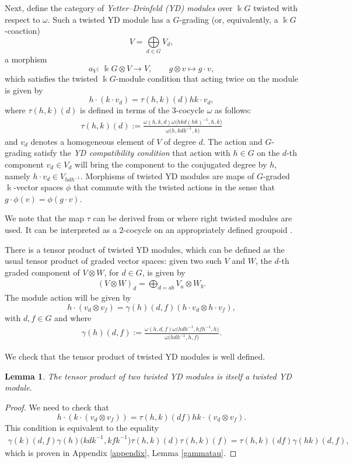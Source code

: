 \documentclass[pdftex]{sigma}
\numberwithin{equation}{section}
\newtheorem{Lemma}[Theorem]{Lemma}
\begin{document}
Next, define the category of \emph{Yetter--Drinfeld (YD) modules} over $\Bbbk G$ twisted with respect to $\omega$. Such a twisted YD module has a $G$-grading (or, equivalently, a $\Bbbk G$-coaction)
\[V=\bigoplus\limits_{d \in G} V_d,\]
 a morphism
 \[a_V\colon\ \Bbbk G\otimes V\to V, \qquad g\otimes v\mapsto g\cdot v,\]
 which satisfies the twisted $\Bbbk G$-module condition that acting twice on the module is given by
\[
 h \cdot ( k \cdot v_d )=\tau (h,k)(d) hk \cdot v_d,
\]
where $\tau (h,k)(d)$ is defined in terms of the $3$-cocycle $\omega$ as follows:
\begin{align}\label{eq-taudef}
 \tau (h,k)(d):=\frac{\omega(h,k,d) \omega \big(hkd(hk)^{-1},h,k\big)}{\omega\big(h,kdk^{-1},k\big)}
\end{align}
and $v_d$ denotes a homogeneous element of $V$ of degree $d$.
The action and $G$-grading satisfy the \emph{YD compatibility condition} that action with $h \in G$ on the $d$-th component $v_d \in V_d$ will bring the component to the conjugated degree by $h$, namely $h \cdot v_d \in V_{h d h^{-1}}$. Morphisms of twisted YD modules are maps of $G$-graded $\Bbbk$-vector spaces $\phi$ that commute with the twisted actions in the sense that
$g\cdot \phi(v)=\phi(g\cdot v)$.


We note that the map $\tau$ can be derived from \cite[Section~1.3.3]{Wil} or \cite[Proposition 3.2]{Maj98} where right twisted modules are used. It can be interpreted as a $2$-cocycle on an appropriately defined groupoid \cite{Wil}.

There is a tensor product of twisted YD modules, which can be defined as the usual tensor product of graded vector spaces: given two such $V$ and $W$, the $d$-th graded component of $V\otimes W$, for $d\in G$, is given by
\begin{align*}
( V \otimes W )_d=\bigoplus\limits_{d=ab} V_a \otimes W_b.
\end{align*}
The module action will be given by
\[
h \cdot (v_d \otimes v_f )=\gamma(h)(d,f) (h \cdot v_d \otimes h \cdot v_f),
\]
with $d,f \in G$ and where
\begin{align}\label{eq-gammadef}
 \gamma (h)(d,f):=\frac{\omega(h,d,f) \omega\big(hdh^{-1},hfh^{-1},h\big)}{\omega\big(hdh^{-1},h,f\big)}.
\end{align}

We check that the tensor product of twisted YD modules is well defined.

 \begin{Lemma}
 The tensor product of two twisted YD modules is itself a twisted YD module.
 \end{Lemma}
 \begin{proof}
We need to check that
\[h \cdot ( k \cdot ( v_d \otimes v_f ) )=\tau (h,k ) ( df ) hk \cdot ( v_d \otimes v_f ).\]
This condition is equivalent to the equality
 \begin{align*}
 \gamma ( k ) ( d,f ) \gamma ( h ) \big( kdk^{-1},kfk^{-1} \big) \tau ( h,k ) ( d ) \tau ( h,k ) ( f ) =\tau ( h,k ) ( df ) \gamma ( hk ) ( d,f ),
 \end{align*}
 which is proven in Appendix \ref{appendix}, Lemma \ref{gammatau}.
 \end{proof}
\end{document}
